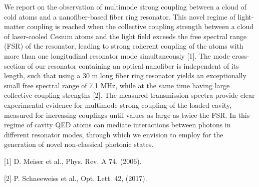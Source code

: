 \documentclass{scdpg}
\begin{document}
\begin{scAbstract}
{}
\scBeginText
We report on the observation of multimode strong coupling between a cloud of cold atoms and a nanofiber-based fiber ring resonator.
This novel regime of light-matter coupling is reached when the collective coupling strength between a cloud of laser-cooled Cesium atoms and the light field exceeds the free spectral range (FSR) of the resonator, leading to strong coherent coupling of the atoms with more than one longitudinal resonator mode simultaneously [1].
The mode cross-section of our resonator containing an optical nanofiber is independent of its length, such that using a 30 m long fiber ring resonator yields an exceptionally small free spectral range of 7.1 MHz, while at the same time having large collective coupling strengths [2].
The measured transmission spectra provide clear experimental evidence for multimode strong coupling of the loaded cavity, measured for increasing couplings until values as large as twice the FSR.
In this regime of cavity QED atoms can mediate interactions between photons in different resonator modes, through which we envision to employ for the generation of novel non-classical photonic states.

[1] D. Meiser et al., Phys. Rev. A 74, (2006).

[2]  P. Schneeweiss et al., Opt. Lett. 42, (2017).
\scEndText
{}
\end{scAbstract}
\end{document}
